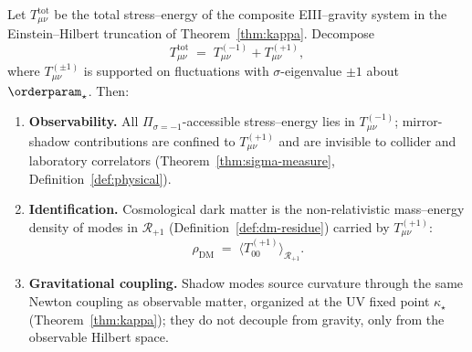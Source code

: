 \begin{theorem}[Dark matter as $\sigma=+1$ cohomology residue]
\label{thm:dm-sector}
Let $T_{\mu\nu}^{\mathrm{tot}}$ be the total stress--energy of the composite
EIII--gravity system in the Einstein--Hilbert truncation of
Theorem~\ref{thm:kappa}. Decompose
\begin{equation}\label{eq:T-split}
  T_{\mu\nu}^{\mathrm{tot}}
  \;=\;
  T_{\mu\nu}^{(-1)}+T_{\mu\nu}^{(+1)},
\end{equation}
where $T_{\mu\nu}^{(\pm1)}$ is supported on fluctuations with
$\sigma$-eigenvalue $\pm1$ about $\orderparam_\star$.
Then:
\begin{enumerate}[label=(\roman*),leftmargin=*]
  \item \textbf{Observability.} All $\Pi_{\sigma=-1}$-accessible stress--energy
    lies in $T_{\mu\nu}^{(-1)}$; mirror-shadow contributions are confined to
    $T_{\mu\nu}^{(+1)}$ and are invisible to collider and laboratory correlators
    (Theorem~\ref{thm:sigma-measure}, Definition~\ref{def:physical}).
  \item \textbf{Identification.} Cosmological dark matter is the
    non-relativistic mass--energy density of modes in $\mathcal{R}_{+1}$
    (Definition~\ref{def:dm-residue}) carried by $T_{\mu\nu}^{(+1)}$:
    \begin{equation}\label{eq:dm-ident}
      \rho_{\mathrm{DM}}
      \;=\;
      \langle T_{00}^{(+1)}\rangle_{\mathcal{R}_{+1}}.
    \end{equation}
  \item \textbf{Gravitational coupling.} Shadow modes source curvature through
    the same Newton coupling as observable matter, organized at the UV fixed
    point $\kappa_\star$ (Theorem~\ref{thm:kappa}); they do not decouple from
    gravity, only from the observable Hilbert space.
\end{enumerate}
\end{theorem}

